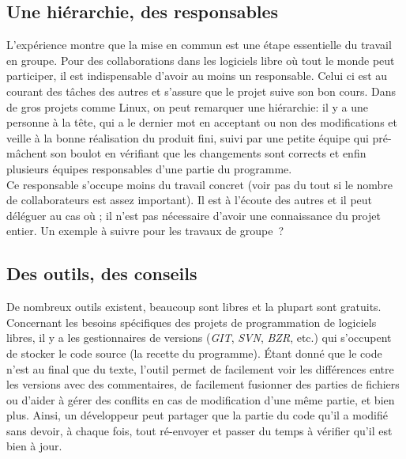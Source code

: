 \documentclass[10pt]{../fiche}
\begin{document}
\subsection*{Une hiérarchie, des responsables}
L'expérience montre que la mise en commun est une étape essentielle du travail en groupe. Pour des collaborations dans les logiciels libre où tout le monde peut participer, il est indispensable d'avoir au moins un responsable. Celui ci est au courant des tâches des autres et s'assure que le projet suive son bon cours.
Dans de gros projets comme Linux, on peut remarquer une hiérarchie: il y a une personne à la tête, qui a le dernier mot en acceptant ou non des modifications et veille à la bonne réalisation du produit fini, suivi par une petite équipe qui pré-mâchent son boulot en vérifiant que les changements sont corrects et enfin plusieurs équipes responsables d'une partie du programme.\\

Ce responsable s'occupe moins du travail concret (voir pas du tout si le nombre de collaborateurs est assez important). Il est à l'écoute des autres et il peut déléguer au cas où ; il n'est pas nécessaire d'avoir une connaissance du projet entier.
Un exemple à suivre pour les travaux de groupe~?

\subsection*{Des outils, des conseils}
De nombreux outils existent, beaucoup sont libres et la plupart sont gratuits.
Concernant les besoins spécifiques des projets de programmation de logiciels libres, il y a les gestionnaires de versions (\textit{GIT}, \textit{SVN}, \textit{BZR}, etc.) qui s'occupent de stocker le code source (la recette du programme). Étant donné que le code n'est au final que du texte, l'outil permet de facilement voir les différences entre les versions avec des commentaires, de facilement fusionner des parties de fichiers ou d'aider à gérer des conflits en cas de modification d'une même partie, et bien plus. Ainsi, un développeur peut partager que la partie du code qu'il a modifié sans devoir, à chaque fois, tout ré-envoyer et passer du temps à vérifier qu'il est bien à jour.\\
\end{document}
